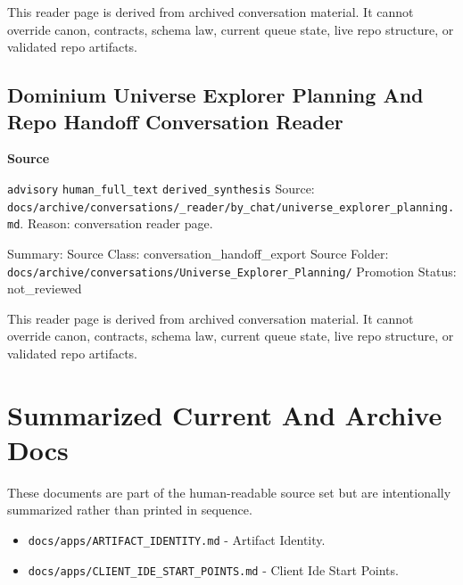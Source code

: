 \documentclass[9pt,a4paper,openany]{book}
\newcommand{\vonecallout}[3]{\par\medskip\noindent\begingroup\setlength{\fboxsep}{7pt}\colorbox{DomCalloutBg}{\parbox{0.94\linewidth}{\textbf{\textcolor{#1}{#2}}\par #3}}\endgroup\par\medskip}
\begin{document}
This reader page is derived from archived conversation material.\allowbreak{} It cannot override canon, contracts, schema law, current queue state, live repo structure, or validated repo artifacts.\allowbreak{}



\subsection{Dominium Universe Explorer Planning And Repo Handoff Conversation Reader}

\vonecallout{DomSlate}{Source}{\texttt{advisory} \texttt{human\_\allowbreak{}full\_\allowbreak{}text} \texttt{derived\_\allowbreak{}synthesis} Source: \texttt{docs/\allowbreak{}archive/\allowbreak{}conversations/\allowbreak{}\_\allowbreak{}reader/\allowbreak{}by\_\allowbreak{}chat/\allowbreak{}universe\_\allowbreak{}explorer\_\allowbreak{}planning.\allowbreak{}md}.\allowbreak{} Reason: conversation reader page.\allowbreak{}}

Summary: Source Class: conversation\_\allowbreak{}handoff\_\allowbreak{}export Source Folder: \texttt{docs/\allowbreak{}archive/\allowbreak{}conversations/\allowbreak{}Universe\_\allowbreak{}Explorer\_\allowbreak{}Planning/\allowbreak{}} Promotion Status: not\_\allowbreak{}reviewed


This reader page is derived from archived conversation material.\allowbreak{} It cannot override canon, contracts, schema law, current queue state, live repo structure, or validated repo artifacts.\allowbreak{}



\section{Summarized Current And Archive Docs}


These documents are part of the human-\allowbreak{}readable source set but are intentionally summarized rather than printed in sequence.\allowbreak{}



\begin{itemize}
\item \texttt{docs/\allowbreak{}apps/\allowbreak{}ARTIFACT\_\allowbreak{}IDENTITY.\allowbreak{}md} -\allowbreak{} Artifact Identity.\allowbreak{}
\end{itemize}

\begin{itemize}
\item \texttt{docs/\allowbreak{}apps/\allowbreak{}CLIENT\_\allowbreak{}IDE\_\allowbreak{}START\_\allowbreak{}POINTS.\allowbreak{}md} -\allowbreak{} Client Ide Start Points.\allowbreak{}
\end{itemize}
\end{document}

